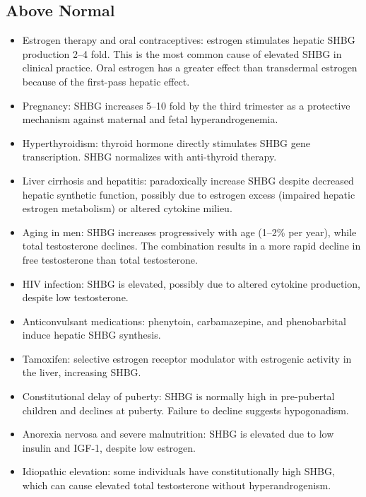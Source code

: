 \subsection*{Above Normal}
\begin{itemize}
  \item Estrogen therapy and oral contraceptives: estrogen stimulates hepatic SHBG production 2--4 fold. This is the most common cause of elevated SHBG in clinical practice. Oral estrogen has a greater effect than transdermal estrogen because of the first-pass hepatic effect.
  \item Pregnancy: SHBG increases 5--10 fold by the third trimester as a protective mechanism against maternal and fetal hyperandrogenemia.
  \item Hyperthyroidism: thyroid hormone directly stimulates SHBG gene transcription. SHBG normalizes with anti-thyroid therapy.
  \item Liver cirrhosis and hepatitis: paradoxically increase SHBG despite decreased hepatic synthetic function, possibly due to estrogen excess (impaired hepatic estrogen metabolism) or altered cytokine milieu.
  \item Aging in men: SHBG increases progressively with age (1--2\% per year), while total testosterone declines. The combination results in a more rapid decline in free testosterone than total testosterone.
  \item HIV infection: SHBG is elevated, possibly due to altered cytokine production, despite low testosterone.
  \item Anticonvulsant medications: phenytoin, carbamazepine, and phenobarbital induce hepatic SHBG synthesis.
  \item Tamoxifen: selective estrogen receptor modulator with estrogenic activity in the liver, increasing SHBG.
  \item Constitutional delay of puberty: SHBG is normally high in pre-pubertal children and declines at puberty. Failure to decline suggests hypogonadism.
  \item Anorexia nervosa and severe malnutrition: SHBG is elevated due to low insulin and IGF-1, despite low estrogen.
  \item Idiopathic elevation: some individuals have constitutionally high SHBG, which can cause elevated total testosterone without hyperandrogenism.
\end{itemize}

